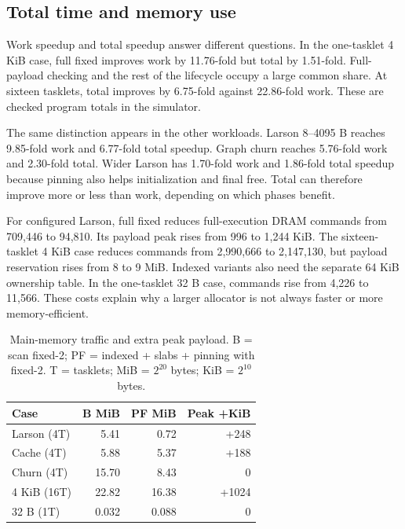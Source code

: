 \documentclass[conference]{IEEEtran}
\begin{document}
\subsection{Total time and memory use}
Work speedup and total speedup answer different questions. In the one-tasklet 4 KiB case, full fixed improves work by 11.76-fold but total by 1.51-fold. Full-payload checking and the rest of the lifecycle occupy a large common share. At sixteen tasklets, total improves by 6.75-fold against 22.86-fold work. These are checked program totals in the simulator.

The same distinction appears in the other workloads. Larson 8--4095 B reaches 9.85-fold work and 6.77-fold total speedup. Graph churn reaches 5.76-fold work and 2.30-fold total. Wider Larson has 1.70-fold work and 1.86-fold total speedup because pinning also helps initialization and final free. Total can therefore improve more or less than work, depending on which phases benefit.

For configured Larson, full fixed reduces full-execution DRAM commands from 709,446 to 94,810. Its payload peak rises from 996 to 1,244 KiB. The sixteen-tasklet 4 KiB case reduces commands from 2,990,666 to 2,147,130, but payload reservation rises from 8 to 9 MiB. Indexed variants also need the separate 64 KiB ownership table. In the one-tasklet 32 B case, commands rise from 4,226 to 11,566. These costs explain why a larger allocator is not always faster or more memory-efficient.
\begin{table}[t]
\caption{Main-memory traffic and extra peak payload. B = scan fixed-2; PF = indexed + slabs + pinning with fixed-2. T = tasklets; MiB = $2^{20}$ bytes; KiB = $2^{10}$ bytes.}\label{tab:traffic}
\centering\small
\begin{tabular}{lrrr}\toprule
Case & B MiB & PF MiB & Peak +KiB \\ \midrule
Larson (4T) & 5.41 & 0.72 & +248 \\
Cache (4T) & 5.88 & 5.37 & +188 \\
Churn (4T) & 15.70 & 8.43 & 0 \\
4 KiB (16T) & 22.82 & 16.38 & +1024 \\
32 B (1T) & 0.032 & 0.088 & 0 \\
\bottomrule\end{tabular}
\par\vspace{2pt}{\footnotesize Peak is PF minus B; B in request sizes means bytes. The separate 64 KiB ownership map is excluded from payload peaks.}
\end{table}
\end{document}
